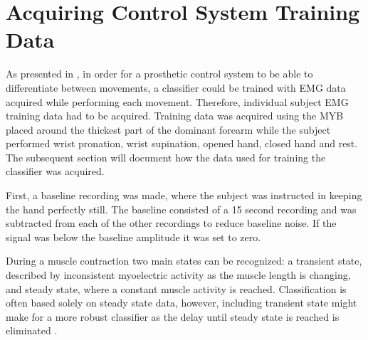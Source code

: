 
\section{Acquiring Control System Training Data}

As presented in , in order for a prosthetic control system to be able to differentiate between movements, a classifier could be trained with EMG data acquired while performing each movement. Therefore, individual subject EMG training data had to be acquired. Training data was acquired using the MYB placed around the thickest part of the dominant forearm while the subject performed wrist pronation, wrist supination, opened hand, closed hand and rest. The subsequent section will document how the data used for training the classifier was acquired. 

First, a baseline recording was made, where the subject was instructed in keeping the hand perfectly still. The baseline consisted of a 15 second recording and was subtracted from each of the other recordings to reduce baseline noise. If the signal was below the baseline amplitude it was set to zero. 

During a muscle contraction two main states can be recognized: a transient state, described by inconsistent myoelectric activity as the muscle length is changing, and steady state, where a constant muscle activity is reached. \cite{Mobarak2014} Classification is often based solely on steady state data, however, including transient state might make for a more robust classifier as the delay until steady state is reached is eliminated \cite{Boschmann2013,Mobarak2014a}. \\
%


